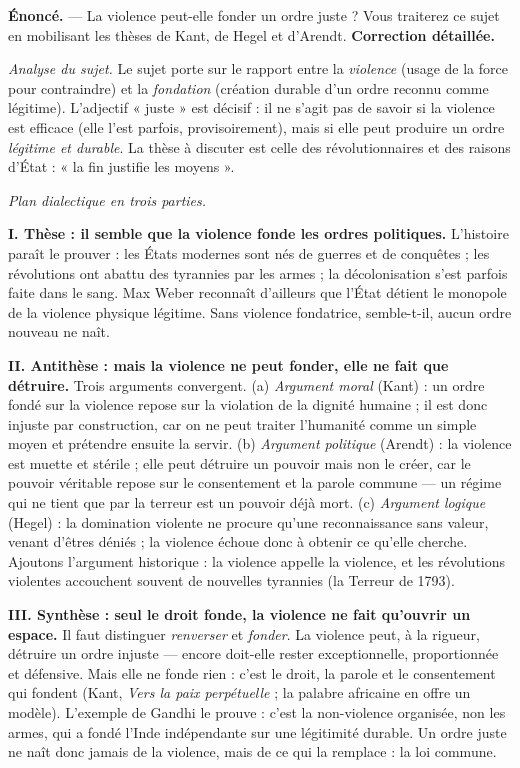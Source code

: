 \documentclass[11pt]{article}
\begin{document}
\begin{exoresolu}
\textbf{Énoncé.} — La violence peut-elle fonder un ordre juste ? Vous traiterez ce sujet en mobilisant les thèses de Kant, de Hegel et d'Arendt.
\tcblower
\textbf{Correction détaillée.}

\emph{Analyse du sujet.} Le sujet porte sur le rapport entre la \emph{violence} (usage de la force pour contraindre) et la \emph{fondation} (création durable d'un ordre reconnu comme légitime). L'adjectif « juste » est décisif : il ne s'agit pas de savoir si la violence est efficace (elle l'est parfois, provisoirement), mais si elle peut produire un ordre \emph{légitime et durable}. La thèse à discuter est celle des révolutionnaires et des raisons d'État : « la fin justifie les moyens ».

\emph{Plan dialectique en trois parties.}

\textbf{I. Thèse : il semble que la violence fonde les ordres politiques.} L'histoire paraît le prouver : les États modernes sont nés de guerres et de conquêtes ; les révolutions ont abattu des tyrannies par les armes ; la décolonisation s'est parfois faite dans le sang. Max Weber reconnaît d'ailleurs que l'État détient le monopole de la violence physique légitime. Sans violence fondatrice, semble-t-il, aucun ordre nouveau ne naît.

\textbf{II. Antithèse : mais la violence ne peut fonder, elle ne fait que détruire.} Trois arguments convergent. (a) \emph{Argument moral} (Kant) : un ordre fondé sur la violence repose sur la violation de la dignité humaine ; il est donc injuste par construction, car on ne peut traiter l'humanité comme un simple moyen et prétendre ensuite la servir. (b) \emph{Argument politique} (Arendt) : la violence est muette et stérile ; elle peut détruire un pouvoir mais non le créer, car le pouvoir véritable repose sur le consentement et la parole commune — un régime qui ne tient que par la terreur est un pouvoir déjà mort. (c) \emph{Argument logique} (Hegel) : la domination violente ne procure qu'une reconnaissance sans valeur, venant d'êtres déniés ; la violence échoue donc à obtenir ce qu'elle cherche. Ajoutons l'argument historique : la violence appelle la violence, et les révolutions violentes accouchent souvent de nouvelles tyrannies (la Terreur de 1793).

\textbf{III. Synthèse : seul le droit fonde, la violence ne fait qu'ouvrir un espace.} Il faut distinguer \emph{renverser} et \emph{fonder}. La violence peut, à la rigueur, détruire un ordre injuste — encore doit-elle rester exceptionnelle, proportionnée et défensive. Mais elle ne fonde rien : c'est le droit, la parole et le consentement qui fondent (Kant, \emph{Vers la paix perpétuelle} ; la palabre africaine en offre un modèle). L'exemple de Gandhi le prouve : c'est la non-violence organisée, non les armes, qui a fondé l'Inde indépendante sur une légitimité durable. Un ordre juste ne naît donc jamais de la violence, mais de ce qui la remplace : la loi commune.


\end{exoresolu}
\end{document}
